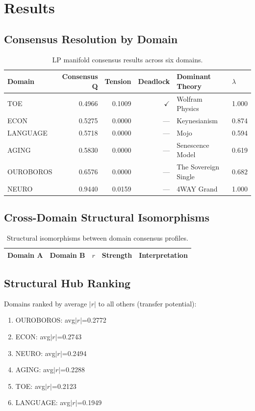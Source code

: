 \documentclass{article}
\begin{document}
\section{Results}
\subsection{Consensus Resolution by Domain}
\begin{table}[h]
\centering
\begin{tabular}{lrrrll}
\toprule
Domain & Consensus Q & Tension & Deadlock & Dominant Theory & $\lambda$ \\
\midrule
  TOE & 0.4966 & 0.1009 & $\checkmark$ & Wolfram Physics & 1.000 \\
  ECON & 0.5275 & 0.0000 & --- & Keynesianism & 0.874 \\
  LANGUAGE & 0.5718 & 0.0000 & --- & Mojo & 0.594 \\
  AGING & 0.5830 & 0.0000 & --- & Senescence Model & 0.619 \\
  OUROBOROS & 0.6576 & 0.0000 & --- & The Sovereign Single & 0.682 \\
  NEURO & 0.9440 & 0.0159 & --- & 4WAY Grand & 1.000 \\
\bottomrule
\end{tabular}
\caption{LP manifold consensus results across six domains.}
\label{tab:consensus}
\end{table}

\subsection{Cross-Domain Structural Isomorphisms}
\begin{table}[h]
\centering
\begin{tabular}{llrrl}
\toprule
Domain A & Domain B & $r$ & Strength & Interpretation \\
\midrule
\bottomrule
\end{tabular}
\caption{Structural isomorphisms between domain consensus profiles.}
\label{tab:iso}
\end{table}

\subsection{Structural Hub Ranking}
Domains ranked by average $|r|$ to all others (transfer potential):
\begin{enumerate}
  \item OUROBOROS: avg$|r|$=0.2772
  \item ECON: avg$|r|$=0.2743
  \item NEURO: avg$|r|$=0.2494
  \item AGING: avg$|r|$=0.2288
  \item TOE: avg$|r|$=0.2123
  \item LANGUAGE: avg$|r|$=0.1949
\end{enumerate}
\end{document}

